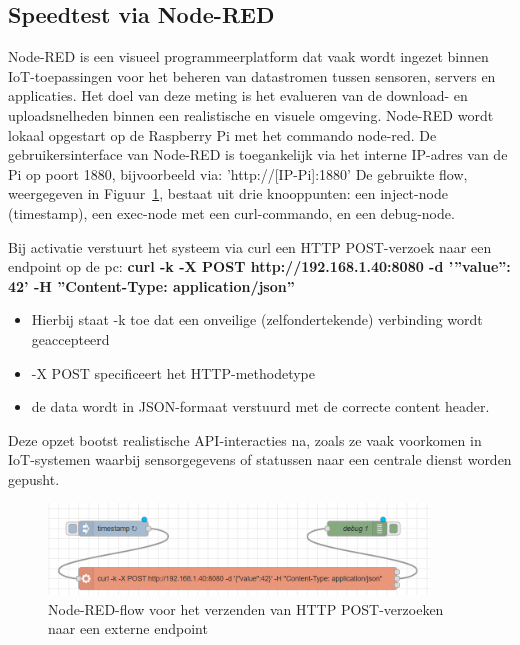 \subsection{Speedtest via Node-RED}
Node-RED is een visueel programmeerplatform dat vaak wordt ingezet binnen IoT-toepassingen voor het beheren van datastromen tussen sensoren, servers en applicaties. Het doel van deze meting is het evalueren van de download- en uploadsnelheden binnen een realistische en visuele omgeving. 
Node-RED wordt lokaal opgestart op de Raspberry Pi met het commando node-red. De gebruikersinterface van Node-RED is toegankelijk via het interne IP-adres van de Pi op poort 1880, bijvoorbeeld via: ’http://[IP-Pi]:1880’
De gebruikte flow, weergegeven in Figuur~\ref{fig:nodered-flow}, bestaat uit drie knooppunten: een inject-node (timestamp), een exec-node met een curl-commando, en een debug-node. 

Bij activatie verstuurt het systeem via curl een HTTP POST-verzoek naar een endpoint op de pc: \textbf{curl -k -X POST http://192.168.1.40:8080 -d ’”value”: 42’ -H ”Content-Type: application/json”}


\begin{itemize}
    \item Hierbij staat -k toe dat een onveilige (zelfondertekende) verbinding wordt geaccepteerd
    \item -X POST specificeert het HTTP-methodetype
    \item de data wordt in JSON-formaat verstuurd met de correcte content header.
\end{itemize}

Deze opzet bootst realistische API-interacties na, zoals ze vaak voorkomen in IoT-systemen waarbij sensorgegevens of statussen naar een centrale dienst worden gepusht.


\begin{figure}[h]
    \centering
    \includegraphics[width=0.9\textwidth]{../graphics/node-red_flow.png}
    \caption[Node-RED-flow voor het verzenden van HTTP POST-verzoeken naar een externe endpoint]{Node-RED-flow voor het verzenden van HTTP POST-verzoeken naar een externe endpoint}
    \label{fig:nodered-flow}
\end{figure}

